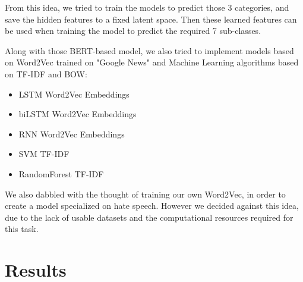 \documentclass[11pt]{article}
\begin{document}
\begin{enumerate}
	      From this idea, we tried to train the models to predict those 3
	      categories, and save the hidden features to a fixed latent space.
	      Then these learned features can be used when training the model to
	      predict the required 7 sub-classes.

	      Along with those BERT-based model, we also tried to implement models
	      based on Word2Vec \cite{mikolov2013word2vec} trained on "Google News"
	      and Machine Learning algorithms based on TF-IDF and BOW:

	      \begin{itemize}
		      \item LSTM Word2Vec Embeddings \cite{staudemeyer2019understanding}
		      \item biLSTM Word2Vec Embeddings \cite{huang2015bidirectional}
		      \item RNN Word2Vec Embeddings \cite{rnn}
		      \item SVM TF-IDF
		      \item RandomForest TF-IDF
	      \end{itemize}

	      We also dabbled with the thought of training our own Word2Vec, in
	      order to create a model specialized on hate speech. However we
	      decided against this idea, due to the lack of usable datasets and the
	      computational resources required for this task.


\end{enumerate}


\section{Results}
\end{document}
